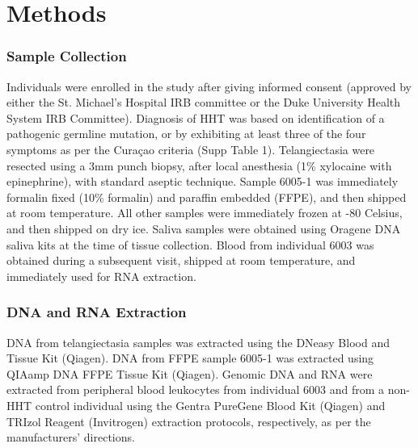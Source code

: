 \section{Methods}
\subsubsection{Sample Collection}
Individuals were enrolled in the study after giving informed consent (approved by either the St. Michael’s Hospital IRB committee or the Duke University Health System IRB Committee).  Diagnosis of HHT was based on identification of a pathogenic germline mutation, or by exhibiting at least three of the four symptoms as per the Cura\c{c}ao criteria (Supp Table 1).\citep{shovlin2000}
Telangiectasia were resected using a 3mm punch biopsy, after local anesthesia (1\% xylocaine with epinephrine), with standard aseptic technique.  Sample 6005-1 was immediately formalin fixed (10\% formalin) and paraffin embedded (FFPE), and then shipped at room temperature.  All other samples were immediately frozen at -80 Celsius, and then shipped on dry ice.  Saliva samples were obtained using Oragene DNA saliva kits at the time of tissue collection. Blood from individual 6003 was obtained during a subsequent visit, shipped at room temperature, and immediately used for RNA extraction. 

\subsubsection{DNA and RNA Extraction}
DNA from telangiectasia samples was extracted using the DNeasy Blood and Tissue Kit (Qiagen). DNA from FFPE sample 6005-1 was extracted using QIAamp DNA FFPE Tissue Kit (Qiagen). Genomic DNA and RNA were extracted from peripheral blood leukocytes from individual 6003 and from a non-HHT control individual using the Gentra PureGene Blood Kit (Qiagen) and TRIzol Reagent (Invitrogen) extraction protocols, respectively, as per the manufacturers’ directions. 

